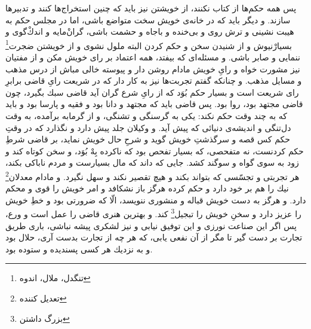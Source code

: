 پس همه حكم‌ها از كتاب نكنند، از خويشتن نيز بايد كه چنين استخراج‌ها كنند و تدبيرها سازند. و ديگر بايد كه در خانه‌ی خويش سخت متواضع باشى، اما در مجلس حكم به هيبت نشينى و ترش روى و بى‌خنده و باجاه و حشمت باشى، گران‌ْمايه و اندك‌ْگوى و بسيار‌ْنيوش و از شنيدن سخن و حكم كردن البته ملول نشوى و از خويشتن ضجرت\footnote{تنگدل،‌ ملال، اندوه} ننمايى و صابر باشى. و مسئله‌اى كه بيفتد، همه اعتماد بر راى خويش مكن و از مفتيان نيز مشورت خواه و راىِ خويش مادام روشن دار و پيوسته خالى مباش از درس مذهب و مسايل مذهب. و چنانكه گفتم تجربت‌ها نيز به كار دار كه در شريعت راىِ قاضى برابرِ راى شريعت است و بسيار حكم بُوَد كه از راىِ شرع گران آيد قاضى سبك بگيرد، چون قاضى مجتهد بود، روا بود. پس قاضى بايد كه مجتهد و دانا بود و فقيه و پارسا بود و بايد كه به چند وقت حكم نكند: يكى به گرسنگى و تشنگى، و از گرمابه برآمده، به وقت دل‌تنگى و انديشه‌ی دنيائى كه پيش آيد. و وكيلان جلد پيش دارد و نگذارد كه در وقتِ حكم كس قصه و سرگذشتِ خويش گويد و شرحِ حال خويش نمايد، بر قاضى شرطِ حكم كردنست، نه متفحصى، كه بسيار تفحص بود كه ناكرده بِهْ بُوَد، و سخن كوتاه كند و زود به سوى گواه و سوگند كشد. جايى كه داند كه مال بسيارست و مردم ناباكى بكند، هر تجربتى و تجسّسى كه بتواند بكند و هيچ تقصير نكند و سهل نگيرد. و مادام معدلان\footnote{تعدیل کننده} نيك را هم بر خود دارد و حكم كرده هرگز باز نشكافد و امر خويش را قوى و محكم دارد. و هرگز به دست خويش قباله و منشورى ننويسد، الّا كه ضرورتى بود و خطِ خويش را عزيز دارد و سخنِ خويش را تبجيل\footnote{بزرگ داشتن} كند. و بهترين هنرى قاضى را عمل است و ورع، پس اگر اين صناعت نورزى و اين توفيق نيابى و نيز لشكرى پيشه نباشى، بارى طريق تجارت بر دست گير تا مگر از آن نفعى يابى، كه هر چه از تجارت بدست آرى، حلال بود و به نزديك هر كسى پسنديده و ستوده بود. 


\newpage

